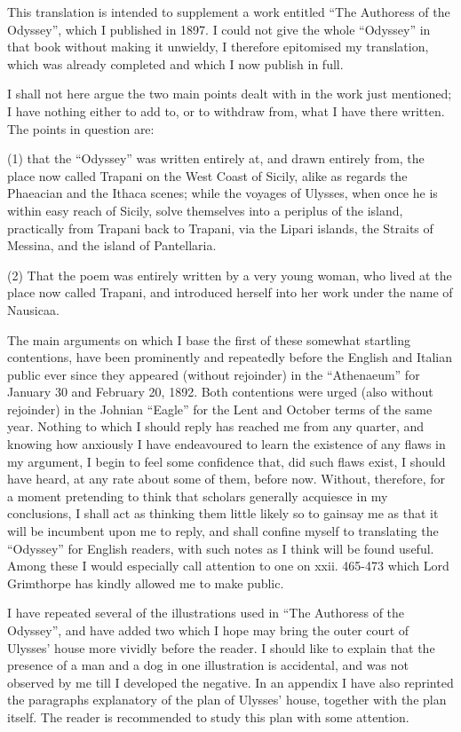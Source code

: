 
This translation is intended to supplement a work entitled “The Authoress of
the Odyssey”, which I published in 1897. I could not give the whole “Odyssey”
in that book without making it unwieldy, I therefore epitomised my translation,
which was already completed and which I now publish in full.

I shall not here argue the two main points dealt with in the work just
mentioned; I have nothing either to add to, or to withdraw from, what I have
there written. The points in question are:

(1) that the “Odyssey” was written entirely at, and drawn entirely from, the
place now called Trapani on the West Coast of Sicily, alike as regards the
Phaeacian and the Ithaca scenes; while the voyages of Ulysses, when once he is
within easy reach of Sicily, solve themselves into a periplus of the island,
practically from Trapani back to Trapani, via the Lipari islands, the Straits
of Messina, and the island of Pantellaria.

(2) That the poem was entirely written by a very young woman, who lived at the
place now called Trapani, and introduced herself into her work under the name
of Nausicaa.

The main arguments on which I base the first of these somewhat startling
contentions, have been prominently and repeatedly before the English and
Italian public ever since they appeared (without rejoinder) in the “Athenaeum”
for January 30 and February 20, 1892. Both contentions were urged (also without
rejoinder) in the Johnian “Eagle” for the Lent and October terms of the same
year. Nothing to which I should reply has reached me from any quarter, and
knowing how anxiously I have endeavoured to learn the existence of any flaws in
my argument, I begin to feel some confidence that, did such flaws exist, I
should have heard, at any rate about some of them, before now. Without,
therefore, for a moment pretending to think that scholars generally acquiesce
in my conclusions, I shall act as thinking them little likely so to gainsay me
as that it will be incumbent upon me to reply, and shall confine myself to
translating the “Odyssey” for English readers, with such notes as I think will
be found useful. Among these I would especially call attention to one on xxii.
465-473 which Lord Grimthorpe has kindly allowed me to make public.

I have repeated several of the illustrations used in “The Authoress of the
Odyssey”, and have added two which I hope may bring the outer court of Ulysses’
house more vividly before the reader. I should like to explain that the
presence of a man and a dog in one illustration is accidental, and was not
observed by me till I developed the negative. In an appendix I have also
reprinted the paragraphs explanatory of the plan of Ulysses’ house, together
with the plan itself. The reader is recommended to study this plan with some
attention.

